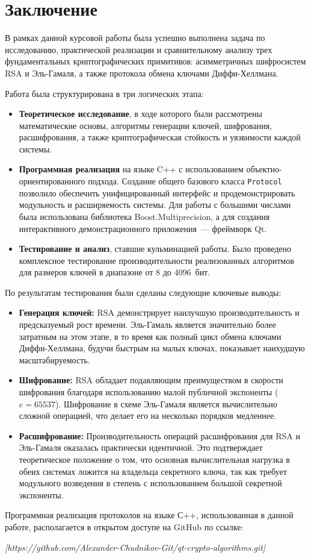 \section{Заключение}

\noindent
В рамках данной курсовой работы была успешно выполнена задача по исследованию, практической реализации и сравнительному анализу трех фундаментальных криптографических примитивов: асимметричных шифросистем RSA и Эль-Гамаля, а также протокола обмена ключами Диффи-Хеллмана.

Работа была структурирована в три логических этапа:
\begin{itemize}
    \item \textbf{Теоретическое исследование}, в ходе которого были рассмотрены математические основы, алгоритмы генерации ключей, шифрования, расшифрования, а также криптографическая стойкость и уязвимости каждой системы.
    \item \textbf{Программная реализация} на языке C++ с использованием объектно-ориентированного подхода. Создание общего базового класса \texttt{Protocol} позволило обеспечить унифицированный интерфейс и продемонстрировать модульность и расширяемость системы. Для работы с большими числами была использована библиотека Boost.Multiprecision, а для создания интерактивного демонстрационного приложения~— фреймворк Qt.
    \item \textbf{Тестирование и анализ}, ставшие кульминацией работы. Было проведено комплексное тестирование производительности реализованных алгоритмов для размеров ключей в диапазоне от 8 до 4096~бит.
\end{itemize}

По результатам тестирования были сделаны следующие ключевые выводы:
\begin{itemize}
    \item \textbf{Генерация ключей:} RSA демонстрирует наилучшую производительность и предсказуемый рост времени. Эль-Гамаль является значительно более затратным на этом этапе, в то время как полный цикл обмена ключами Диффи-Хеллмана, будучи быстрым на малых ключах, показывает наихудшую масштабируемость.
    \item \textbf{Шифрование:} RSA обладает подавляющим преимуществом в скорости шифрования благодаря использованию малой публичной экспоненты ($e=65537$). Шифрование в схеме Эль-Гамаля является вычислительно сложной операцией, что делает его на несколько порядков медленнее.
    \item \textbf{Расшифрование:} Производительность операций расшифрования для RSA и Эль-Гамаля оказалась практически идентичной. Это подтверждает теоретическое положение о том, что основная вычислительная нагрузка в обеих системах ложится на владельца секретного ключа, так как требует модульного возведения в степень с использованием большой секретной экспоненты.
\end{itemize}

\vspace{1cm}

\noindent
Программная реализация протоколов на языке С++, использованная в данной работе, располагается в открытом доступе на GitHub по ссылке:

\vspace{1cm}
\begin{center}
    \textit{[https://github.com/Alexander-Chudnikov-Git/qt-crypto-algorithms.git]}
\end{center}
\vspace{1cm}